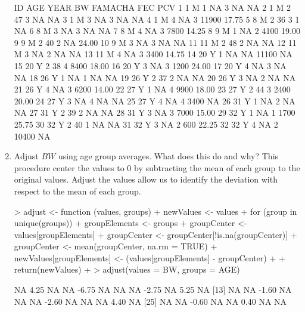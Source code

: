 \documentclass[12pt,a4paper]{paper}
\begin{document}
\begin{enumerate}
\begin{Schunk}
\begin{Soutput}
   ID AGE YEAR BW FAMACHA   FEC   PCV
1   1   M    1 NA       3    NA    NA
2   1   M    2 47       3    NA    NA
3   1   M    3 NA       3    NA    NA
4   1   M    4 NA       3 11900 17.75
5   8   M    2 36       3     1    NA
6   8   M    3 NA       3    NA    NA
7   8   M    4 NA       3  7800 14.25
8   9   M    1 NA       2  4100 19.00
9   9   M    2 40       2    NA 24.00
10  9   M    3 NA       3    NA    NA
11 11   M    2 48       2    NA    NA
12 11   M    3 NA       2    NA    NA
13 11   M    4 NA       3  3400 14.75
14 20   Y    1 NA      NA 11100    NA
15 20   Y    2 38       4  8400 18.00
16 20   Y    3 NA       3  1200 24.00
17 20   Y    4 NA       3    NA    NA
18 26   Y    1 NA       1    NA    NA
19 26   Y    2 37       2    NA    NA
20 26   Y    3 NA       2    NA    NA
21 26   Y    4 NA       3  6200 14.00
22 27   Y    1 NA       4  9900 18.00
23 27   Y    2 44       3  2400 20.00
24 27   Y    3 NA       4    NA    NA
25 27   Y    4 NA       4  3400    NA
26 31   Y    1 NA       2    NA    NA
27 31   Y    2 39       2    NA    NA
28 31   Y    3 NA       3  7000 15.00
29 32   Y    1 NA       1  1700 25.75
30 32   Y    2 40       1    NA    NA
31 32   Y    3 NA       2   600 22.25
32 32   Y    4 NA       2 10400    NA
\end{Soutput}
\end{Schunk}
\item Adjust $BW$ using age group averages. What does this do and why? This procedure center the values to 0 by subtracting the mean of each group to the original values. Adjust the values allow us to identify the deviation with respect to the mean of each group.
\begin{Schunk}
\begin{Sinput}
> adjust <- function (values, groups) {
+   newValues <- values
+   for (group in unique(groups)) {
+     groupElements <- groups %in% group
+     groupCenter <- values[groupElements]
+     groupCenter <- groupCenter[!is.na(groupCenter)]
+     groupCenter <- mean(groupCenter, na.rm = TRUE)
+     newValues[groupElements] <- (values[groupElements] - groupCenter)
+   }
+   return(newValues)
+ }
> adjust(values = BW, groups = AGE)
\end{Sinput}
\begin{Soutput}
 [1]    NA  4.25    NA    NA -6.75    NA    NA    NA -2.75    NA  5.25    NA
[13]    NA    NA -1.60    NA    NA    NA -2.60    NA    NA    NA  4.40    NA
[25]    NA    NA -0.60    NA    NA  0.40    NA    NA
\end{Soutput}
\end{Schunk}

\end{enumerate}
\end{document}
